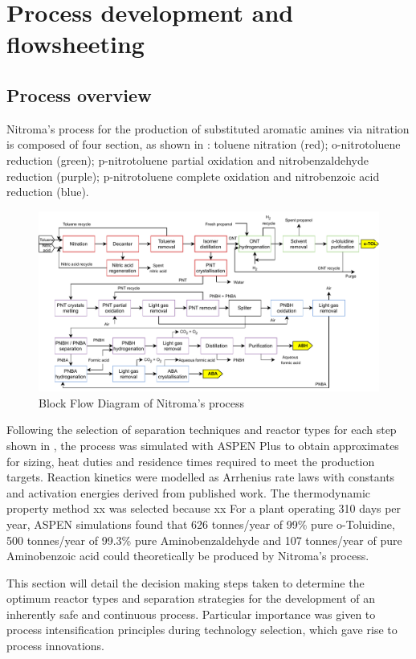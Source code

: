 \section{Process development and flowsheeting}

\subsection{Process overview}

Nitroma's process for the production of substituted aromatic amines via nitration is composed of four section, as shown in : toluene nitration (red); o-nitrotoluene reduction (green); p-nitrotoluene partial oxidation and nitrobenzaldehyde reduction (purple); p-nitrotoluene complete oxidation and nitrobenzoic acid reduction (blue). 


\begin{figure}[H]
    \centering
    \includegraphics[width=\linewidth]{1-Figures/BFD_nitroma.pdf}
    \caption{Block Flow Diagram of Nitroma's process}
    \label{fig:BFD}
\end{figure}

Following the selection of separation techniques and reactor types for each step shown in , the process was simulated with ASPEN Plus to obtain approximates for sizing, heat duties and residence times required to meet the production targets. Reaction kinetics were modelled as Arrhenius rate laws with constants and activation energies derived from published work. The thermodynamic property method xx was selected because xx
For a plant operating 310 days per year, ASPEN simulations found that 626 tonnes/year of 99\% pure o-Toluidine, 500 tonnes/year of 99.3\% pure Aminobenzaldehyde and 107 tonnes/year of pure Aminobenzoic acid could theoretically be produced by Nitroma's process.

This section will detail the decision making steps taken to determine the optimum reactor types and separation strategies for the development of an inherently safe and continuous process. Particular importance was given to process intensification principles during technology selection, which gave rise to process innovations.



